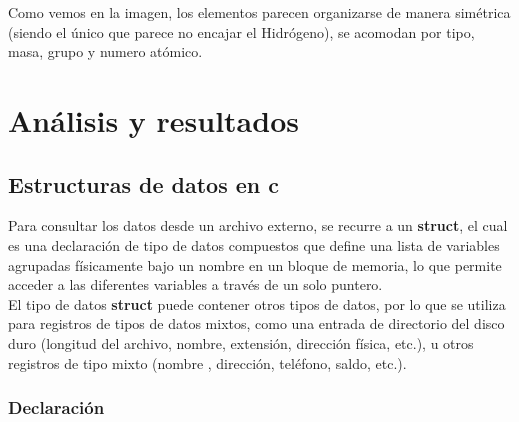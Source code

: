 \documentclass[12pt]{article}
\begin{document}
	\begin{multicols}{2}
				Como vemos en la imagen, los elementos parecen organizarse de manera simétrica (siendo el único que parece no encajar el Hidrógeno), se acomodan por tipo, masa, grupo y numero atómico.
		\section{Análisis y resultados}
			\subsection{Estructuras de datos en c}
				Para consultar los datos desde un archivo externo, se recurre a un \textbf{struct}, el cual es una declaración de tipo de datos compuestos que define una lista de variables agrupadas físicamente bajo un nombre en un bloque de memoria, lo que permite acceder a las diferentes variables a través de un solo puntero.\\
				El tipo de datos \textbf{struct} puede contener otros tipos de datos, por lo que se utiliza para registros de tipos de datos mixtos, como una entrada de directorio del disco duro (longitud del archivo, nombre, extensión, dirección física, etc.), u otros registros de tipo mixto (nombre , dirección, teléfono, saldo, etc.).\\
				\subsubsection{Declaración}
					 

\end{multicols}
\end{document}
